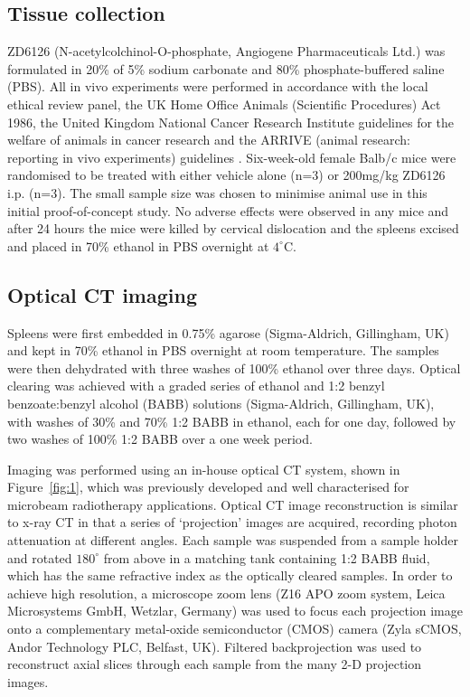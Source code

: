 	\subsection{Tissue collection}
	ZD6126 (N-acetylcolchinol-O-phosphate, Angiogene Pharmaceuticals Ltd.) was formulated in 20\% of 5\% sodium carbonate and 80\% phosphate-buffered saline (PBS). 
	All in vivo experiments were performed in accordance with the local ethical review panel, the UK Home Office Animals (Scientific Procedures) Act 1986, the United Kingdom National Cancer Research Institute guidelines for the welfare of animals in cancer research \cite{workman2010guidelines} and the ARRIVE (animal research: reporting in vivo experiments) guidelines \cite{mcgrath2010guidelines}. Six-week-old female Balb/c mice were randomised to be treated with either vehicle alone (n=3) or 200mg/kg ZD6126 i.p. (n=3). The small sample size was chosen to minimise animal use in this initial proof-of-concept study. No adverse effects were observed in any mice and after 24 hours the mice were killed by cervical dislocation and the spleens excised and placed in 70\% ethanol in PBS overnight at $4^{\circ}$C.
	
	\subsection{Optical CT imaging}
	Spleens were first embedded in 0.75\% agarose (Sigma-Aldrich, Gillingham, UK) and kept in 70\% ethanol in PBS overnight at room temperature. The samples were then dehydrated with three washes of 100\% ethanol over three days. Optical clearing was achieved with a graded series of ethanol and 1:2 benzyl benzoate:benzyl alcohol (BABB) solutions (Sigma-Aldrich, Gillingham, UK), with washes of 30\% and 70\% 1:2 BABB in ethanol, each for one day, followed by two washes of 100\% 1:2 BABB over a one week period. 
	
	Imaging was performed using an in-house optical CT system, shown in Figure~\ref{fig:1}, which was previously developed and well characterised for microbeam radiotherapy applications. \cite{doranestablishing2013} Optical CT image reconstruction is similar to x-ray CT in that a series of `projection' images are acquired, recording photon attenuation at different angles. Each sample was suspended from a sample holder and rotated $180^{\circ}$ from above in a matching tank containing 1:2 BABB fluid, which has the same refractive index as the optically cleared samples. In order to achieve high resolution, a microscope zoom lens (Z16 APO zoom system, Leica Microsystems GmbH, Wetzlar, Germany) was used to focus each projection image onto a complementary metal-oxide semiconductor (CMOS) camera (Zyla sCMOS, Andor Technology PLC, Belfast, UK). Filtered backprojection was used to reconstruct axial slices through each sample from the many 2-D projection images. 
	
